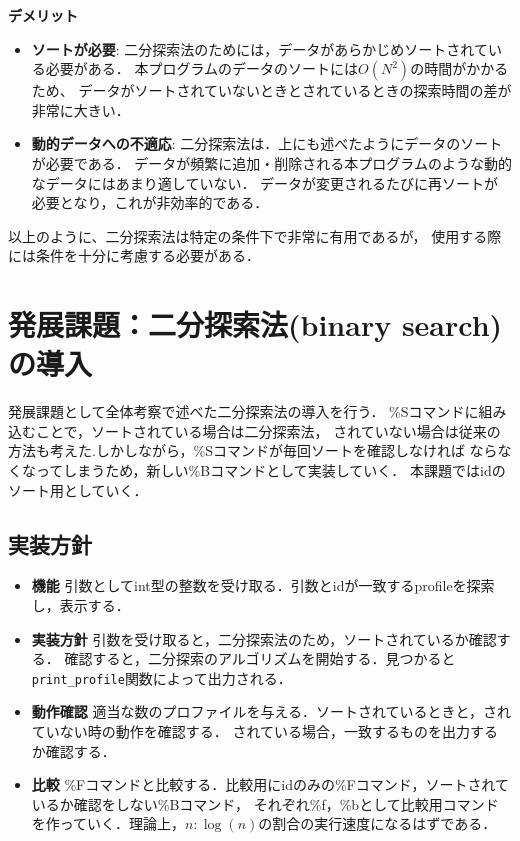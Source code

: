     \textbf{デメリット}
    \begin{itemize}
    \item \textbf{ソートが必要}:
    二分探索法のためには，データがあらかじめソートされている必要がある．
    本プログラムのデータのソートには$O(N^2)$の時間がかかるため、
    データがソートされていないときとされているときの探索時間の差が非常に大きい．
    \item \textbf{動的データへの不適応}:
    二分探索法は．上にも述べたようにデータのソートが必要である．
    データが頻繁に追加・削除される本プログラムのような動的なデータにはあまり適していない．
    データが変更されるたびに再ソートが必要となり，これが非効率的である．
    \end{itemize}
    以上のように、二分探索法は特定の条件下で非常に有用であるが，
    使用する際には条件を十分に考慮する必要がある．

\subsection{}\label{cosider2}

\section{発展課題：二分探索法(binary search)の導入}
発展課題として全体考察で述べた二分探索法の導入を行う．
\%Sコマンドに組み込むことで，ソートされている場合は二分探索法，
されていない場合は従来の方法も考えた.しかしながら，\%Sコマンドが毎回ソートを確認しなければ
ならなくなってしまうため，新しい\%Bコマンドとして実装していく．
本課題ではidのソート用としていく．
\subsection{実装方針}
\begin{itemize}
  \item \textbf{機能} 引数としてint型の整数を受け取る．引数とidが一致するprofileを探索し，表示する．
  \item \textbf{実装方針} 引数を受け取ると，二分探索法のため，ソートされているか確認する．
  確認すると，二分探索のアルゴリズムを開始する．見つかると\texttt{print\_profile}関数によって出力される．
  \item \textbf{動作確認} 適当な数のプロファイルを与える．ソートされているときと，されていない時の動作を確認する．
  されている場合，一致するものを出力するか確認する．
  \item \textbf{比較} \%Fコマンドと比較する．比較用にidのみの\%Fコマンド，ソートされているか確認をしない\%Bコマンド，
  それぞれ\%f，\%bとして比較用コマンドを作っていく．理論上，$n : \log(n)$の割合の実行速度になるはずである．
\end{itemize}
